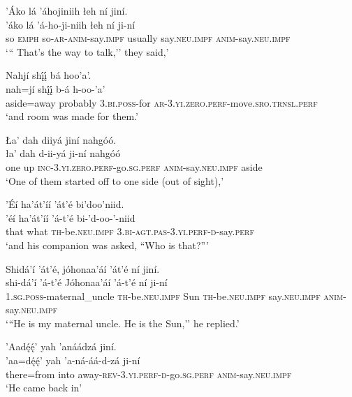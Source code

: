 \ea\label{ex:text4-2-25}
’Áko lá ’áhojiniih łeh ní jiní.\\
\gll ’áko	lá	’á-ho-ji-niih	łeh	ní	ji-ní\\
     so	\textsc{emph}	so-\textsc{ar}-\textsc{anim}-say.\textsc{impf}	usually	say.\textsc{neu}.\textsc{impf}	\textsc{anim}-say.\textsc{neu}.\textsc{impf}\\
\glt `{``} That's the way to talk,'' they said,'
\z

\ea\label{ex:text4-2-26}
Nahjí shį́į́ bá hoo’a’.\\
\gll nah=jí	shį́į́	b-á	h-oo-’a’\\
     aside=away	probably	3.\textsc{bi}.\textsc{poss}-for	\textsc{ar}-3.\textsc{yi}.\textsc{zero}.\textsc{perf}-move.\textsc{sro}.\textsc{trnsl}.\textsc{perf}\\
\glt `and room was made for them.'
\z

\ea\label{ex:text4-3-1}
Ła’ dah diiyá jiní nahgóó.\\
\gll ła’	dah	d-ii-yá	ji-ní	nahgóó\\
     one	up	\textsc{inc}-3.\textsc{yi}.\textsc{zero}.\textsc{perf}-go.\textsc{sg}.\textsc{perf}	\textsc{anim}-say.\textsc{neu}.\textsc{impf}	aside\\
\glt `One of them started off to one side (out of sight),'
\z

\ea\label{ex:text4-3-2}
’Éí ha’át’íí ’át’é bi’doo’niid.\\
\gll ’éí	ha’át’íí	’á-t’é	bi-’d-oo-’-niid\\
     that	what	\textsc{th}-be.\textsc{neu}.\textsc{impf}	3.\textsc{bi}-\textsc{agt}.\textsc{pas}-3.\textsc{yi}.\textsc{perf}-\textsc{d}-say.\textsc{perf}\\
\glt `and his companion was asked, ``Who is that?{''}'
\z

\ea\label{ex:text4-3-3}
Shidá’í ’át’é, jóhonaa’áí ’át’é ní jiní.\\
\gll shi-dá’í	’á-t’é	Jóhonaa’áí	’á-t’é	ní	ji-ní\\
     1.\textsc{sg}.\textsc{poss}-maternal\_uncle	\textsc{th}-be.\textsc{neu}.\textsc{impf}	Sun	\textsc{th}-be.\textsc{neu}.\textsc{impf}	say.\textsc{neu}.\textsc{impf}	\textsc{anim}-say.\textsc{neu}.\textsc{impf}\\
\glt `{``}He is my maternal uncle. He is the Sun,'' he replied.'
\z

\ea\label{ex:text4-3-4}
’Aadę́ę́’ yah ’anáádzá jiní.\\
\gll ’aa=dę́ę́’	yah	’a-ná-áá-d-zá	ji-ní\\
     there=from	into	away-\textsc{rev}-3.\textsc{yi}.\textsc{perf}-\textsc{d}-go.\textsc{sg}.\textsc{perf}	\textsc{anim}-say.\textsc{neu}.\textsc{impf}\\
\glt `He came back in'
\z

